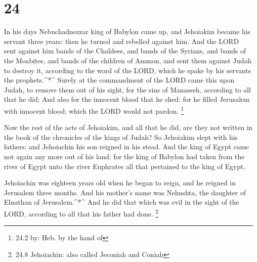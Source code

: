 \hypertarget{section-23}{%
\section{24}\label{section-23}}

 In his days Nebuchadnezzar king of Babylon came up, and
Jehoiakim became his servant three years: then he turned and rebelled
against him.  And the LORD sent against him bands of the
Chaldees, and bands of the Syrians, and bands of the Moabites, and bands
of the children of Ammon, and sent them against Judah to destroy it,
according to the word of the LORD, which he spake by his servants the
prophets.\^{}*\^{}  Surely at the commandment of the LORD
came this upon Judah, to remove them out of his sight, for the sins of
Manasseh, according to all that he did;  And also for the
innocent blood that he shed: for he filled Jerusalem with innocent
blood; which the LORD would not pardon. \footnote{24.2 by: Heb. by the
  hand of}

 Now the rest of the acts of Jehoiakim, and all that he did,
are they not written in the book of the chronicles of the kings of
Judah?  So Jehoiakim slept with his fathers: and Jehoiachin
his son reigned in his stead.  And the king of Egypt came
not again any more out of his land: for the king of Babylon had taken
from the river of Egypt unto the river Euphrates all that pertained to
the king of Egypt.

 Jehoiachin was eighteen years old when he began to reign,
and he reigned in Jerusalem three months. And his mother's name was
Nehushta, the daughter of Elnathan of Jerusalem.\^{}*\^{} 
And he did that which was evil in the sight of the LORD, according to
all that his father had done. \footnote{24.8 Jehoiachin: also called
  Jeconiah and Coniah}

